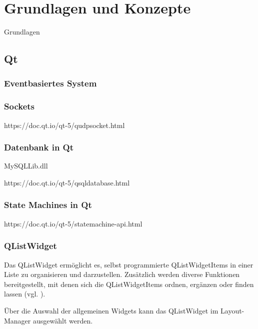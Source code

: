 
\chapter{Grundlagen und Konzepte}
\label{sec:Grundlagen}

Grundlagen

\section{Qt}

\subsection{Eventbasiertes System}
\label{sec:Eventbasiert}

\subsection{Sockets}
\label{sec:QTSocket}
https://doc.qt.io/qt-5/qudpsocket.html
\cite{qt_socket}

\subsection{Datenbank in Qt}
\label{sec:QTDatabase}
MySQLLib.dll

https://doc.qt.io/qt-5/qsqldatabase.html
\cite{qt_database}

\subsection{State Machines in Qt}
\label{sec:StateMachines}
https://doc.qt.io/qt-5/statemachine-api.html
\cite{qt_statemachine}

\subsection{QListWidget}
\label{sec:QListWidgetItem}


Das QListWidget ermöglicht es, selbst programmierte QListWidgetItems in einer Liste zu organisieren und darzustellen. Zusätzlich werden diverse Funktionen bereitgestellt, mit denen sich die QListWidgetItems ordnen, ergänzen oder finden lassen (vgl. \cite{qt_listwidget}). 

Über die Auswahl der allgemeinen Widgets kann das QListWidget im Layout-Manager ausgewählt werden. 
